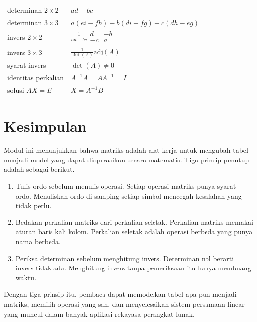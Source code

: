 \documentclass[11pt,a4paper]{article}
\begin{document}
\begin{table}[H]
\begin{tabularx}{\textwidth}{l X}
		determinan $2 \times 2$    & $ad-bc$                                                         \\
		determinan $3 \times 3$    & $a(ei-fh)-b(di-fg)+c(dh-eg)$                                    \\
		invers $2 \times 2$        & $\frac{1}{ad-bc}\begin{smallmatrix}d&-b\\-c&a\end{smallmatrix}$ \\
		invers $3 \times 3$        & $\frac{1}{\det(A)}\text{adj}(A)$                                \\
		syarat invers              & $\det(A) \ne 0$                                                 \\
		identitas perkalian        & $A^{-1}A=AA^{-1}=I$                                             \\
		solusi $AX=B$              & $X=A^{-1}B$                                                     \\
		\bottomrule
	\end{tabularx}
\end{table}

\section{Kesimpulan}

Modul ini menunjukkan bahwa matriks adalah alat kerja untuk mengubah tabel menjadi model yang dapat dioperasikan secara matematis. Tiga prinsip penutup adalah sebagai berikut.

\begin{enumerate}
	\item Tulis ordo sebelum menulis operasi. Setiap operasi matriks punya syarat ordo. Menuliskan ordo di samping setiap simbol mencegah kesalahan yang tidak perlu.
	\item Bedakan perkalian matriks dari perkalian seletak. Perkalian matriks memakai aturan baris kali kolom. Perkalian seletak adalah operasi berbeda yang punya nama berbeda.
	\item Periksa determinan sebelum menghitung invers. Determinan nol berarti invers tidak ada. Menghitung invers tanpa pemeriksaan itu hanya membuang waktu.
\end{enumerate}

Dengan tiga prinsip itu, pembaca dapat memodelkan tabel apa pun menjadi matriks, memilih operasi yang sah, dan menyelesaikan sistem persamaan linear yang muncul dalam banyak aplikasi rekayasa perangkat lunak.
\end{document}

